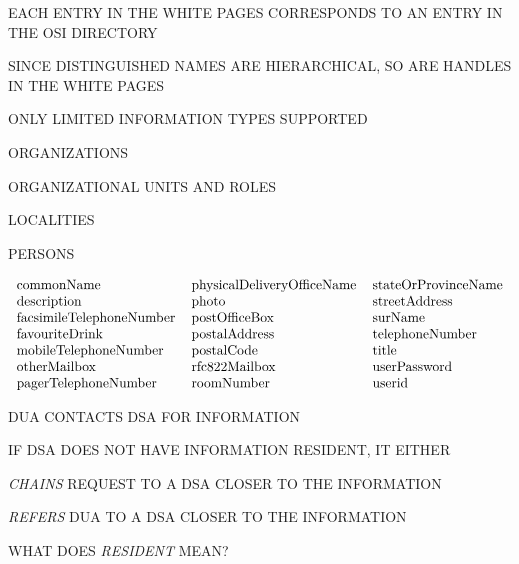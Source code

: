 \begin{bwslide}

\begin{nrtc}
\item	EACH ENTRY IN THE WHITE PAGES CORRESPONDS TO AN ENTRY IN THE OSI
	DIRECTORY

\item	SINCE DISTINGUISHED NAMES ARE HIERARCHICAL,
	SO ARE HANDLES IN THE WHITE PAGES 

\item	ONLY LIMITED INFORMATION TYPES SUPPORTED
    \begin{nrtc}
    \item	ORGANIZATIONS

    \item	ORGANIZATIONAL UNITS AND ROLES

    \item	LOCALITIES

    \item	PERSONS
    \end{nrtc}
\end{nrtc}
\end{bwslide}


\begin{bwslide}
\small

\[\begin{tabular}{lll}
commonName&		    physicalDeliveryOfficeName&	stateOrProvinceName\\
description&		    photo&			streetAddress\\
facsimileTelephoneNumber&   postOfficeBox&		surName\\
favouriteDrink&		    postalAddress&		telephoneNumber\\
mobileTelephoneNumber&      postalCode&			title\\
otherMailbox&		    rfc822Mailbox&		userPassword\\
pagerTelephoneNumber&	    roomNumber&			userid
\end{tabular}\]
\end{bwslide}


\begin{bwslide}

\begin{nrtc}
\item	DUA CONTACTS DSA FOR INFORMATION

\item	IF DSA DOES NOT HAVE INFORMATION RESIDENT,
	IT EITHER
    \begin{nrtc}
    \item	\emph{CHAINS} REQUEST TO A DSA CLOSER TO THE INFORMATION

    \item	\emph{REFERS} DUA TO A DSA CLOSER TO THE INFORMATION
    \end{nrtc}

\item	WHAT DOES \emph{RESIDENT} MEAN?
\end{nrtc}
\end{bwslide}


